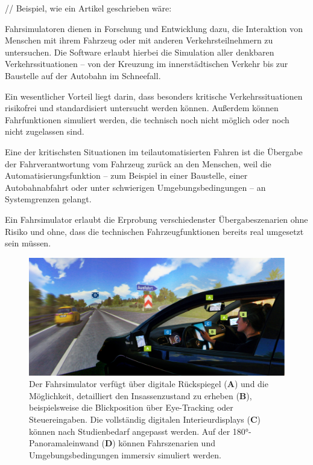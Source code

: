 // Beispiel, wie ein Artikel geschrieben wäre:
{\mediumfamily\color{white} Fahrsimulatoren dienen in Forschung und Entwicklung dazu, die Interaktion von Menschen mit ihrem Fahrzeug oder mit anderen Verkehrsteilnehmern zu untersuchen. Die Software erlaubt hierbei die Simulation aller denkbaren Verkehrssituationen -- von der Kreuzung im innerstädtischen Verkehr bis zur Baustelle auf der Autobahn im Schneefall. 

Ein wesentlicher Vorteil liegt darin, dass besonders kritische Verkehrssituationen risikofrei und standardisiert untersucht werden können. Außerdem können Fahrfunktionen simuliert werden, die technisch noch nicht möglich oder noch nicht zugelassen sind.


Eine der kritischsten Situationen im teilautomatisierten Fahren ist die Übergabe der Fahrverantwortung vom Fahrzeug zurück an den Menschen, weil die Automatisierungsfunktion -- zum Beispiel in einer Baustelle, einer Autobahnabfahrt oder unter schwierigen Umgebungsbedingungen -- an Systemgrenzen gelangt.

Ein Fahrsimulator erlaubt die Erprobung verschiedenster Übergabeszenarien ohne Risiko und ohne, dass die technischen Fahrzeugfunktionen bereits real umgesetzt sein müssen.}



\begin{figure}[t]%
\begin{nomargin} %
\vspace{-\texttopoffset} %
\includegraphics[width=\columnwidth]{content/caudri/images/ifab-sim1a}%
\end{nomargin} %
\caption{Der Fahrsimulator verfügt über digitale Rückspiegel (\textbf{A}) und die Möglichkeit, detailliert den Insassenzustand zu erheben (\textbf{B}), beispielsweise die Blickposition über Eye-Tracking oder Steuereingaben. Die vollständig digitalen Interieurdisplays (\textbf{C}) können nach Studienbedarf angepasst werden. Auf der 180°-Panoramaleinwand (\textbf{D}) können Fahrszenarien und Umgebungsbedingungen immersiv simuliert werden.}%
%
\end{figure}


